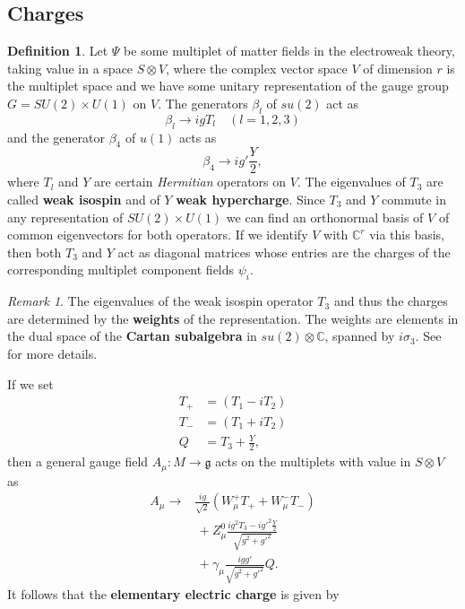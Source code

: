 \documentclass[11pt]{amsart}
\theoremstyle{definition}
\newtheorem{defn}[thm]{Definition}
\theoremstyle{remark}
\newtheorem{rem}[thm]{Remark}
\numberwithin{equation}{section}
\begin{document}
\subsection{Charges}
\begin{defn}Let $\Psi$ be some multiplet of matter fields in the electroweak theory, taking value in a space $S\otimes V$, where the complex vector space $V$ of dimension $r$ is the multiplet space and we have some unitary representation of the gauge group $G=SU(2)\times U(1)$ on $V$. The generators $\beta_l$ of $su(2)$ act as 
\begin{equation*}
\beta_l\rightarrow igT_l\quad(l=1,2,3)
\end{equation*}
and the generator $\beta_4$ of $u(1)$ acts as 
\begin{equation*}
\beta_4\rightarrow ig'\frac{Y}{2},
\end{equation*}
where $T_l$ and $Y$ are certain {\em Hermitian} operators on $V$. The eigenvalues of $T_3$ are called {\bf weak isospin} and of $Y$ {\bf weak hypercharge}. Since $T_3$ and $Y$ commute in any representation of $SU(2)\times U(1)$ we can find an orthonormal basis of $V$ of common eigenvectors for both operators. If we identify $V$ with $\mathbb{C}^r$ via this basis, then both $T_3$ and $Y$ act as diagonal matrices whose entries are the charges of the corresponding multiplet component fields $\psi_i$.
\end{defn}
\begin{rem}The eigenvalues of the weak isospin operator $T_3$ and thus the charges are determined by the {\bf weights} of the representation. The weights are elements in the dual space of the {\bf Cartan subalgebra} in $su(2)\otimes\mathbb{C}$, spanned by $i\sigma_3$. See \cite{Ziller} for more details.
\end{rem}
If we set
\begin{align*}
T_+&=(T_1-iT_2)\\
T_-&=(T_1+iT_2)\\
Q&=T_3+\frac{Y}{2},
\end{align*}
then a general gauge field $A_\mu\colon M\rightarrow \mathfrak{g}$ acts on the multiplets with value in $S\otimes V$ as 
\begin{align*}
A_\mu\rightarrow&\frac{ig}{\sqrt{2}}(W^+_\mu T_++W^-_\mu T_-)\\
&\,+Z^0_\mu\frac{ig^2T_3-ig'^2\frac{Y}{2}}{\sqrt{g^2+g'^2}}\\
&\,+\gamma_\mu\frac{igg'}{\sqrt{g^2+g'^2}}Q.
\end{align*} 
It follows that the {\bf elementary electric charge} is given by 
\end{document}
